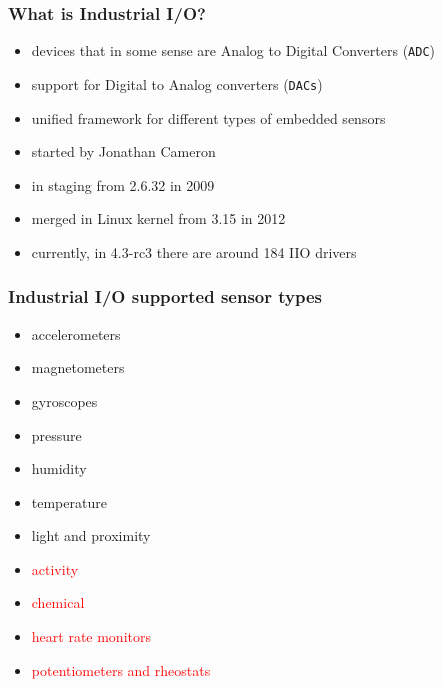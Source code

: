 \documentclass[aspectratio=169]{beamer}
\begin{document}


\begin{frame}
\frametitle{What is Industrial I/O?}
\begin{itemize}
    \item devices that in some sense are Analog to Digital Converters (\texttt{ADC})
    \item support for Digital to Analog converters (\texttt{DACs})
    \item unified framework for different types of embedded sensors
    \item started by Jonathan Cameron
    \item in staging from 2.6.32 in 2009
    \item merged in Linux kernel from 3.15 in 2012
    \item currently, in 4.3-rc3 there are around 184 IIO drivers
\end{itemize}
\end{frame}


\begin{frame}
\frametitle{Industrial I/O supported sensor types}
\begin{itemize}
    \item accelerometers
    \item magnetometers
    \item gyroscopes
    \item pressure
    \item humidity
    \item temperature
    \item light and proximity
    \item \textcolor{red}{activity}
    \item \textcolor{red}{chemical}
    \item \textcolor{red}{heart rate monitors}
    \item \textcolor{red}{potentiometers and rheostats}
\end{itemize}
\end{frame}
\end{document}
